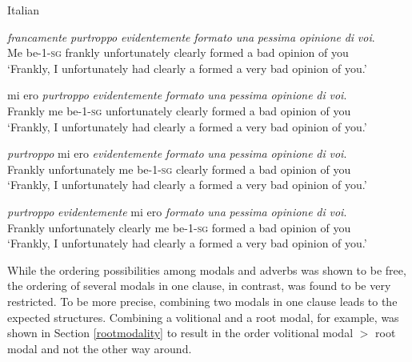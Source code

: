 \begin{exe} 
\ex Italian \citep[49]{cinque1999adverbs}\label{finiteauxcinqueq} \begin{xlist} 
\ex {} {\textit{francamente}} {\textit{purtroppo}} {\textit{evidentemente}} {\textit{formato}} {\textit{una}} {\textit{pessima}} {\textit{opinione}} {\textit{di}} {\textit{voi}.}  \\
{Me be-1-\textsc{sg}} {frankly} {unfortunately} {clearly} {formed} {a} {bad} {opinion} {of} {you} \\
\trans `Frankly, I unfortunately had clearly a formed a very bad opinion of you.' \label{finiteauxcinqueaq}

\ex {} {mi ero} {\textit{purtroppo}} {\textit{evidentemente}} {\textit{formato}} {\textit{una}} {\textit{pessima}} {\textit{opinione}} {\textit{di}} {\textit{voi}.}  \\
 {Frankly} {me be-1-\textsc{sg}} {unfortunately} {clearly} {formed} {a} {bad} {opinion} {of} {you} \\
\trans `Frankly, I unfortunately had clearly a formed a very bad opinion of you.' \label{finiteauxcinquebq}

\ex {}  {\textit{purtroppo}} {mi ero} {\textit{evidentemente}} {\textit{formato}} {\textit{una}} {\textit{pessima}} {\textit{opinione}} {\textit{di}} {\textit{voi}.}  \\
 {Frankly}  {unfortunately} {me be-1-\textsc{sg}} {clearly} {formed} {a} {bad} {opinion} {of} {you} \\
\trans `Frankly, I unfortunately had clearly a formed a very bad opinion of you.' \label{finiteauxcinquecq}

\ex {}  {\textit{purtroppo}}  {\textit{evidentemente}} {mi ero} {\textit{formato}} {\textit{una}} {\textit{pessima}} {\textit{opinione}} {\textit{di}} {\textit{voi}.}  \\
 {Frankly}  {unfortunately}  {clearly} {me be-1-\textsc{sg}} {formed} {a} {bad} {opinion} {of} {you} \\
\trans `Frankly, I unfortunately had clearly a formed a very bad opinion of you.' \label{finiteauxcinquedq}

\end{xlist} 
\end{exe}

\noindent While the ordering possibilities among modals and adverbs was shown to be free, the ordering of several modals in one clause, in contrast, was found to be very restricted. To be more precise, combining two modals in one clause leads to the expected structures. Combining a volitional and a root modal, for example, was shown in Section \ref{rootmodality} to result in the order volitional modal $>$ root modal and not the other way around.

